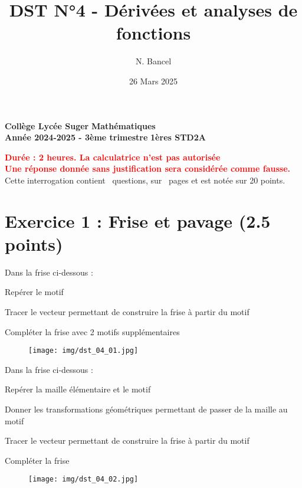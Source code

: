 \documentclass[answers]{exam}
\title{DST N°4 - Dérivées et analyses de fonctions}
\author{N. Bancel}
\date{26 Mars 2025}
\begin{document}
\textbf{Collège Lycée Suger}
\hfill
\textbf{Mathématiques} \\

\textbf{Année 2024-2025 - 3ème trimestre}
\hfill
\textbf{1ères STD2A} \par

{\let\newpage\relax\maketitle}

\begin{center}
\textbf{\textcolor{red}{Durée : 2 heures. La calculatrice n'est pas autorisée}} \\
\textbf{\textcolor{red}{Une réponse donnée sans justification sera considérée comme fausse.}} \\
Cette interrogation contient \numquestions\ questions, sur \numpages\ pages et est notée sur 20 points. 

\end{center}

\section*{Exercice 1 : Frise et pavage (2.5 points)}

\begin{questions} 

\question[1] Dans la frise ci-dessous :
\begin{compactitem}
  \item Repérer le motif
  \item Tracer le vecteur permettant de construire la frise à partir du motif
  \item Compléter la frise avec 2 motifs supplémentaires
\end{compactitem}

\begin{figure}[H]
  \centering
  \texttt{[image: img/dst\_04\_01.jpg]}
\end{figure}

\question[1.5] Dans la frise ci-dessous :
\begin{compactitem}
  \item Repérer la maille élémentaire et le motif
  \item Donner les transformations géométriques permettant de passer de la maille au motif
  \item Tracer le vecteur permettant de construire la frise à partir du motif
  \item Compléter la frise
\end{compactitem}

\begin{figure}[H]
  \centering
  \texttt{[image: img/dst\_04\_02.jpg]}
\end{figure}

\end{questions}
\end{document}
